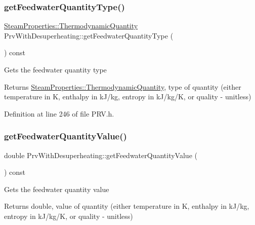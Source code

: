 \subsubsection{\texorpdfstring{get\+Feedwater\+Quantity\+Type()}{getFeedwaterQuantityType()}\hspace{0.1cm}{\footnotesize\ttfamily [3/3]}}
{\footnotesize\ttfamily \hyperlink{class_steam_properties_ae0294bedf7d178c2d8fb6aed0f62fbff}{Steam\+Properties\+::\+Thermodynamic\+Quantity} Prv\+With\+Desuperheating\+::get\+Feedwater\+Quantity\+Type (\begin{DoxyParamCaption}{ }\end{DoxyParamCaption}) const\hspace{0.3cm}{\ttfamily [inline]}}

Gets the feedwater quantity type

\begin{DoxyReturn}{Returns}
\hyperlink{class_steam_properties_ae0294bedf7d178c2d8fb6aed0f62fbff}{Steam\+Properties\+::\+Thermodynamic\+Quantity}, type of quantity (either temperature in K, enthalpy in k\+J/kg, entropy in k\+J/kg/K, or quality -\/ unitless) 
\end{DoxyReturn}


Definition at line 246 of file P\+R\+V.\+h.

\mbox{\label{class_prv_with_desuperheating_a8645a251b2e77e434a8bc51dfedcad69}} 
\subsubsection{\texorpdfstring{get\+Feedwater\+Quantity\+Value()}{getFeedwaterQuantityValue()}\hspace{0.1cm}{\footnotesize\ttfamily [1/3]}}
{\footnotesize\ttfamily double Prv\+With\+Desuperheating\+::get\+Feedwater\+Quantity\+Value (\begin{DoxyParamCaption}{ }\end{DoxyParamCaption}) const\hspace{0.3cm}{\ttfamily [inline]}}

Gets the feedwater quantity value

\begin{DoxyReturn}{Returns}
double, value of quantity (either temperature in K, enthalpy in k\+J/kg, entropy in k\+J/kg/K, or quality -\/ unitless) 
\end{DoxyReturn}


